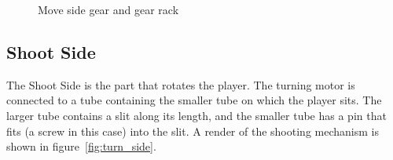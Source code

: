 \begin{center}
\begin{figure}[H]
{%
        }
        \caption[moveside1]{Move side gear and gear rack}
        \label{fig:move_side_gear}
    \end{figure}
\end{center}


\subsection{Shoot Side}\label{subsec:turn-side}
The Shoot Side is the part that rotates the player.
The turning motor is connected to a tube containing the smaller tube on which the player sits.
The larger tube contains a slit along its length, and the smaller tube has a pin that fits (a screw in this case) into the slit.
A render of the shooting mechanism is shown in figure~\ref{fig:turn_side}.

